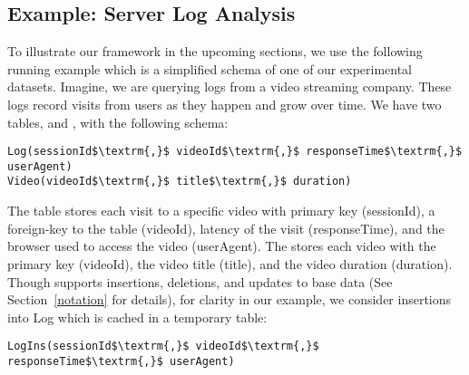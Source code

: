 \subsection{Example: Server Log Analysis}
To illustrate our framework in the upcoming sections, we use the following running example which is a 
simplified schema of one of our experimental datasets.
Imagine, we are querying logs from a video streaming company. 
These logs record visits from users as they happen and grow over time.
We have two tables,  and , with the following schema:
\begin{lstlisting}[mathescape,basicstyle={\scriptsize}]
Log(sessionId$\textrm{,}$ videoId$\textrm{,}$ responseTime$\textrm{,}$ userAgent)
Video(videoId$\textrm{,}$ title$\textrm{,}$ duration)
\end{lstlisting}
The  table stores each visit to a specific video with primary key (\textsf{sessionId}), a foreign-key to the  table (\textsf{videoId}), latency of the visit (\textsf{responseTime}), and the browser used to access the video (\textsf{userAgent}).
The  stores each video with the primary key (\textsf{videoId}), the video title (\textsf{title}), and the video duration (\textsf{duration}).
Though \svc supports insertions, deletions, and updates to base data (See Section~\ref{notation} for details), for clarity in our example, we consider insertions
into Log which is cached in a temporary table:
\begin{lstlisting}[mathescape,basicstyle={\scriptsize}]
LogIns(sessionId$\textrm{,}$ videoId$\textrm{,}$ responseTime$\textrm{,}$ userAgent)
\end{lstlisting}




